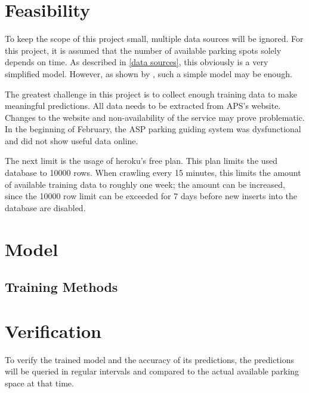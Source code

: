 \section{Feasibility}

To keep the scope of this project small, multiple data sources will be ignored. For this project, it is assumed that the number of available parking spots solely depends on time. As described in \ref{data sources}, this obviously is a very simplified model. However, as shown by \cite{parkendd}, such a simple model may be enough. 

The greatest challenge in this project is to collect enough training data to make meaningful predictions. All data needs to be extracted from APS's website. Changes to the website and non-availability of the service may prove problematic. In the beginning of February, the ASP parking guiding system was dysfunctional and did not show useful data online. 

The next limit is the usage of heroku's free plan. This plan limits the used database to 10000 rows. When crawling every 15 minutes, this limits the amount of available training data to roughly one week; the amount can be increased, since the 10000 row limit can be exceeded for 7 days before new inserts into the database are disabled.


\section{Model}
\subsection{Training Methods} 

\section{Verification}
To verify the trained model and the accuracy of its predictions, the predictions will be queried in regular intervals and compared to the actual available parking space at that time. 